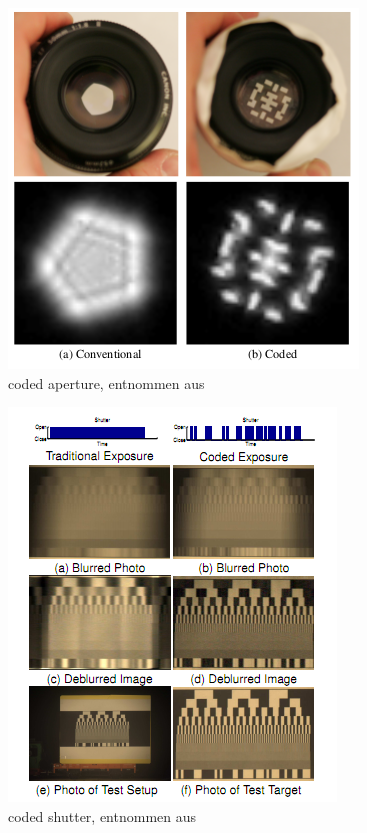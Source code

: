 \documentclass[a4paper,12pt]{article}
\begin{document}
\begin{figure}[htbp]
\centering
\includegraphics[scale=0.8]{coded_aperture.png}
\caption{coded aperture, entnommen aus \cite{coded_aperture}}%
\label{figure_coded_apperture}
\end{figure}

\begin{figure}[htbp]
\centering
\includegraphics[scale=0.8]{coded_shutter.png}
\caption{coded shutter, entnommen aus \cite{coded_shutter}}%
\label{figure_coded_shutter}
\end{figure} 
\newpage
\end{document}
